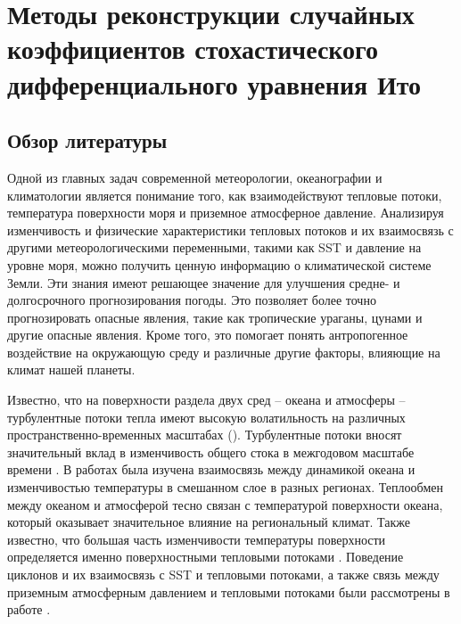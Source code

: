 \chapter{Методы реконструкции случайных коэффициентов стохастического дифференциального уравнения Ито}
\label{ch:Methods}

\section{Обзор литературы}
\label{sec:ch1/Literature}

Одной из главных задач современной метеорологии, океанографии и климатологии является понимание того, как взаимодействуют тепловые потоки, температура поверхности моря и приземное атмосферное давление. Анализируя изменчивость и физические характеристики тепловых потоков и их взаимосвязь с другими метеорологическими переменными, такими как SST и давление на уровне моря, можно получить ценную информацию о климатической системе Земли. Эти знания имеют решающее значение для улучшения средне- и долгосрочного прогнозирования погоды. Это позволяет более точно прогнозировать опасные явления, такие как тропические ураганы, цунами и другие опасные явления. Кроме того, это помогает понять антропогенное воздействие на окружающую среду и различные другие факторы, влияющие на климат нашей планеты.

Известно, что на поверхности раздела двух сред -- океана и атмосферы -- турбулентные потоки тепла имеют высокую волатильность на различных пространственно-временных масштабах (\cite{small2019air,tian2017air}).  Турбулентные потоки вносят значительный вклад в изменчивость общего стока в межгодовом масштабе времени \cite{bentamy2017review}.
В работах \cite{ashin2019observed, schmeisser2019role} была изучена взаимосвязь между динамикой океана и изменчивостью температуры в смешанном слое в разных регионах. Теплообмен между океаном и атмосферой тесно связан с температурой поверхности океана, который оказывает значительное влияние на региональный климат. Также известно, что большая часть изменчивости температуры поверхности определяется именно поверхностными тепловыми потоками \cite{patrizio2021quantifying}. 
Поведение циклонов и их взаимосвязь с SST и тепловыми потоками, а также связь между приземным атмосферным давлением и тепловыми потоками были рассмотрены в работе \cite{tilinina2018association}. 

